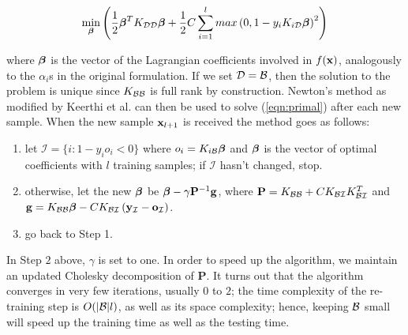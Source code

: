 \begin{equation} \label{eqn:primal}
  \min_{\boldsymbol{\beta}} \left( 
      \frac{1}{2} \boldsymbol{\beta}^T K_{\mathcal{D}\mathcal{D}} \boldsymbol{\beta}
    + \frac{1}{2} C \sum_{i=1}^l max \left(0,1-y_i K_{i\mathcal{D}} \boldsymbol{\beta} \right)^2
  \right)
\end{equation}

\noindent where $\boldsymbol{\beta}$ is the vector of the Lagrangian coefficients involved
in $f(\mathbf{x})$, analogously to the $\alpha_i$s in the original
formulation. If we set $\mathcal{D} = \mathcal{B}$, then the solution to the problem is
unique since $K_{\mathcal{B}\mathcal{B}}$ is full rank by construction. Newton's method
as modified by Keerthi et al. \cite{KeerthiDC05,KeerthiCDC06} can then
be used to solve (\ref{eqn:primal}) after each new sample. When the
new sample $\mathbf{x}_{l+1}$ is received the method goes as follows:

\begin{enumerate}

   \item let $\mathcal{I} = \{ i: 1-y_i o_i<0 \}$ where $o_i =
     K_{i\mathcal{B}} \boldsymbol{\beta}$ and $\boldsymbol{\beta}$ is the vector of optimal coefficients
     with $l$ training samples; if $\mathcal{I}$ hasn't changed, stop.

   \item otherwise, let the new $\boldsymbol{\beta}$ be $\boldsymbol{\beta} - \gamma
     \mathbf{P}^{-1}\mathbf{g}$, where $\mathbf{P} = K_{\mathcal{B}\mathcal{B}} + C
     K_{\mathcal{B}\mathcal{I}} K_{\mathcal{B}\mathcal{I}}^T$ and $\mathbf{g} = K_{\mathcal{B}\mathcal{B}}
     \boldsymbol{\beta} - C K_{\mathcal{B}\mathcal{I}} \left(
     \mathbf{y}_{\mathcal{I}}-\mathbf{o}_{\mathcal{I}}\right)$.

   \item go back to Step 1.

\end{enumerate}

In Step $2$ above, $\gamma$ is set to one. In order to speed up the
algorithm, we maintain an updated Cholesky decomposition of
$\mathbf{P}$. It turns out that the algorithm converges in very few
iterations, usually $0$ to $2$; the time complexity of the re-training
step is $O(|\mathcal{B}|l)$, as well as its space complexity; hence, keeping
$\mathcal{B}$ small will speed up the training time as well as the testing
time.
